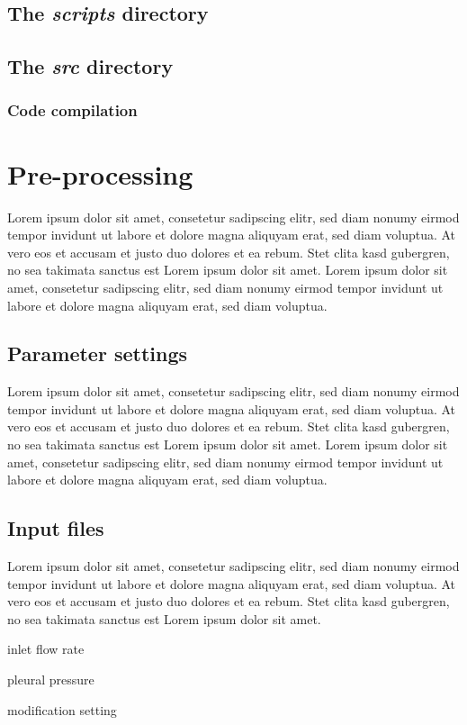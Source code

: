 \subsection{The \textit{scripts} directory}


\subsection{The \textit{src} directory}

\subsubsection{Code compilation}



\section{Pre-processing} \label{sec:preprocessing}
Lorem ipsum dolor sit amet, consetetur sadipscing elitr, sed diam nonumy eirmod tempor invidunt ut labore et dolore magna aliquyam erat, sed diam voluptua. At vero eos et accusam et justo duo dolores et ea rebum. Stet clita kasd gubergren, no sea takimata sanctus est Lorem ipsum dolor sit amet. Lorem ipsum dolor sit amet, consetetur sadipscing elitr, sed diam nonumy eirmod tempor invidunt ut labore et dolore magna aliquyam erat, sed diam voluptua.


\subsection{Parameter settings} \label{ssec:parameter_settingss}
Lorem ipsum dolor sit amet, consetetur sadipscing elitr, sed diam nonumy eirmod tempor invidunt ut labore et dolore magna aliquyam erat, sed diam voluptua. At vero eos et accusam et justo duo dolores et ea rebum. Stet clita kasd gubergren, no sea takimata sanctus est Lorem ipsum dolor sit amet. Lorem ipsum dolor sit amet, consetetur sadipscing elitr, sed diam nonumy eirmod tempor invidunt ut labore et dolore magna aliquyam erat, sed diam voluptua.


\subsection{Input files} \label{ssec:input_files}
Lorem ipsum dolor sit amet, consetetur sadipscing elitr, sed diam nonumy eirmod tempor invidunt ut labore et dolore magna aliquyam erat, sed diam voluptua. At vero eos et accusam et justo duo dolores et ea rebum. Stet clita kasd gubergren, no sea takimata sanctus est Lorem ipsum dolor sit amet.
\begin{description}
  \item inlet flow rate
  \item pleural pressure
  \item modification setting
\end{description}



